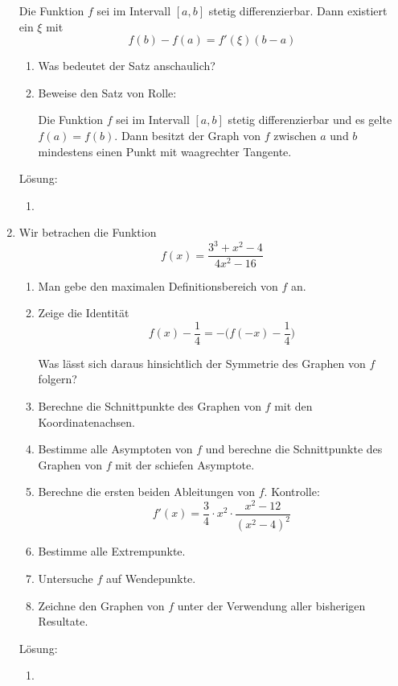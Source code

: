 \documentclass[main.tex]{subfiles}
\begin{document}
\begin{enumerate}
	      Die Funktion \( f \) sei im Intervall \( [a,b] \) stetig differenzierbar.
	      Dann existiert ein \( \xi \) mit
	      \[ f(b) - f(a)  = f'( \xi )( b - a ) \]
	      \begin{enumerate}
		      \item Was bedeutet der Satz anschaulich?
		      \item Beweise den Satz von Rolle:

		            Die Funktion \( f \) sei im Intervall \( [a,b] \) stetig differenzierbar und
		            es gelte \( f(a) = f(b) \). Dann besitzt der Graph von \( f \) zwischen
		            \( a \) und \( b \) mindestens einen Punkt mit waagrechter Tangente.
	      \end{enumerate}
		  
		  Lösung:
		  \begin{enumerate}
			  \item 
		  \end{enumerate}
	\item Wir betrachen die Funktion
	      \[ f(x) = \frac{ 3^3 + x^2 - 4 }{
			      4x^2 - 16
		      } \]
	      \begin{enumerate}
		      \item Man gebe den maximalen Definitionsbereich von \( f \) an.
		      \item Zeige die Identität
		            \[ f(x) - \frac{1}{4} = - \Bigg( f(-x) - \frac{1}{4} \Bigg)  \]

		            Was lässt sich daraus hinsichtlich der Symmetrie des Graphen von
		            \( f \) folgern?
		      \item Berechne die Schnittpunkte des Graphen von \( f \)  mit den Koordinatenachsen.
		      \item Bestimme alle Asymptoten von \( f \) und berechne die Schnittpunkte des
		            Graphen von \( f \)  mit der schiefen Asymptote.
		      \item Berechne die ersten beiden Ableitungen von \( f \).
		            Kontrolle:
		            \[ f'(x) = \frac{3}{4} \cdot x^2 \cdot \frac{ x^2 - 12 }{ (x^2 - 4)^2 } \]
		      \item Bestimme alle Extrempunkte.
		      \item Untersuche \( f \) auf Wendepunkte.
		      \item Zeichne den Graphen von \( f \) unter der Verwendung aller bisherigen Resultate.
	      \end{enumerate}
		  
		  Lösung:
		  \begin{enumerate}
			  \item 
		  \end{enumerate}
\end{enumerate}
\end{document}
